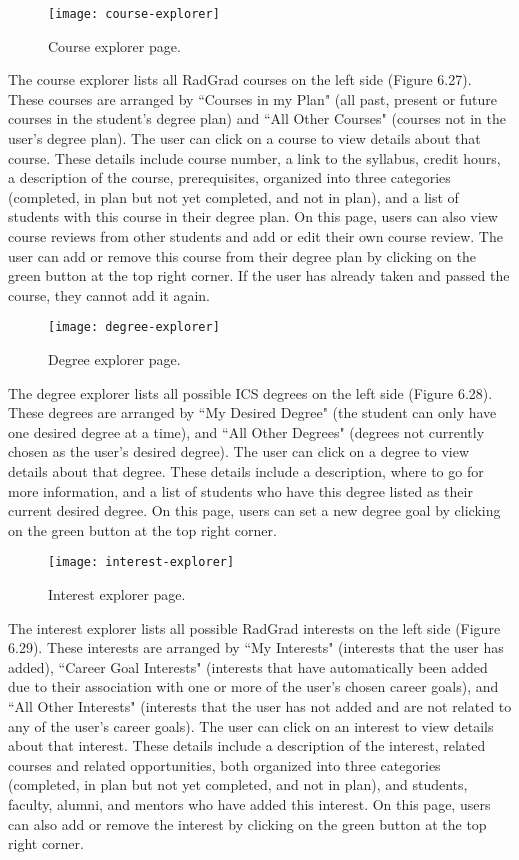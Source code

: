 \begin{figure}[htbp!]
\centering
\texttt{[image: course-explorer]}
\caption{Course explorer page.}
\end{figure}

The course explorer lists all RadGrad courses on the left side (Figure 6.27). These courses are arranged by ``Courses in my Plan" (all past, present or future courses in the student's degree plan) and ``All Other Courses" (courses not in the user's degree plan). The user can click on a course to view details about that course. These details include course number, a link to the syllabus, credit hours, a description of the course, prerequisites, organized into three categories (completed, in plan but not yet completed, and not in plan), and a list of students with this course in their degree plan. On this page, users can also view course reviews from other students and add or edit their own course review. The user can add or remove this course from their degree plan by clicking on the green button at the top right corner. If the user has already taken and passed the course, they cannot add it again.

\begin{figure}[htbp!]
\centering
\texttt{[image: degree-explorer]}
\caption{Degree explorer page.}
\end{figure}

The degree explorer lists all possible ICS degrees on the left side (Figure 6.28). These degrees are arranged by ``My Desired Degree" (the student can only have one desired degree at a time), and ``All Other Degrees" (degrees not currently chosen as the user's desired degree). The user can click on a degree to view details about that degree. These details include a description, where to go for more information, and a list of students who have this degree listed as their current desired degree. On this page, users can set a new degree goal by clicking on the green button at the top right corner.

\begin{figure}[htbp!]
\centering
\texttt{[image: interest-explorer]}
\caption{Interest explorer page.}
\end{figure}

The interest explorer lists all possible RadGrad interests on the left side (Figure 6.29). These interests are arranged by ``My Interests" (interests that the user has added), ``Career Goal Interests" (interests that have automatically been added due to their association with one or more of the user's chosen career goals), and ``All Other Interests" (interests that the user has not added and are not related to any of the user's career goals). The user can click on an interest to view details about that interest. These details include a description of the interest, related courses and related opportunities, both organized into three categories (completed, in plan but not yet completed, and not in plan), and students, faculty, alumni, and mentors who have added this interest. On this page, users can also add or remove the interest by clicking on the green button at the top right corner.

